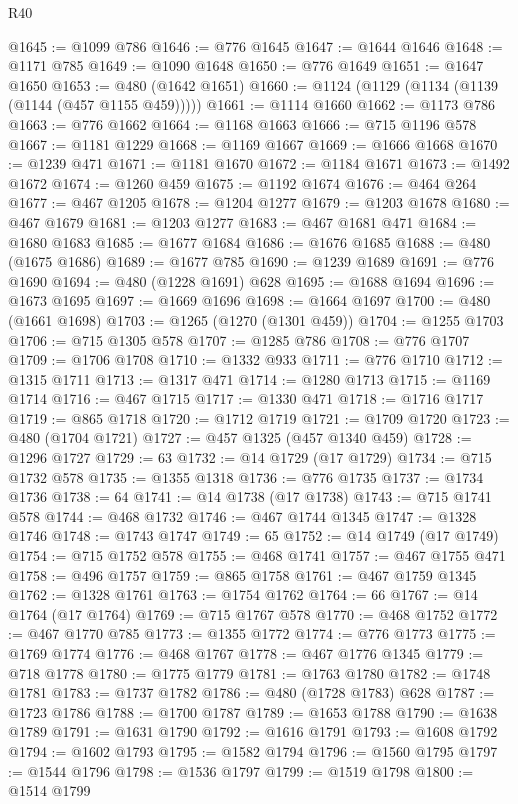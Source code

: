 \begin{lexlean}{R40}
\begin{coremodule}
{{{{{{{{{{{{{{{{{{{{{{{{{{{{{{{{{{{{{{{{{{{{{{{{{{{{{{{{{{{{{{{{{{{{{{{{{{{{{{{{{{{{{{{{{{{{{{{{{{{{{{{{{{{{{@1645 := @1099 @786
@1646 := @776 @1645
@1647 := @1644 @1646
@1648 := @1171 @785
@1649 := @1090 @1648
@1650 := @776 @1649
@1651 := @1647 @1650
@1653 := @480 (@1642 @1651)
@1660 := @1124 (@1129 (@1134 (@1139 (@1144 (@457 @1155 @459)))))
@1661 := @1114 @1660
@1662 := @1173 @786
@1663 := @776 @1662
@1664 := @1168 @1663
@1666 := @715 @1196 @578
@1667 := @1181 @1229
@1668 := @1169 @1667
@1669 := @1666 @1668
@1670 := @1239 @471
@1671 := @1181 @1670
@1672 := @1184 @1671
@1673 := @1492 @1672
@1674 := @1260 @459
@1675 := @1192 @1674
@1676 := @464 @264
@1677 := @467 @1205
@1678 := @1204 @1277
@1679 := @1203 @1678
@1680 := @467 @1679
@1681 := @1203 @1277
@1683 := @467 @1681 @471
@1684 := @1680 @1683
@1685 := @1677 @1684
@1686 := @1676 @1685
@1688 := @480 (@1675 @1686)
@1689 := @1677 @785
@1690 := @1239 @1689
@1691 := @776 @1690
@1694 := @480 (@1228 @1691) @628
@1695 := @1688 @1694
@1696 := @1673 @1695
@1697 := @1669 @1696
@1698 := @1664 @1697
@1700 := @480 (@1661 @1698)
@1703 := @1265 (@1270 (@1301 @459))
@1704 := @1255 @1703
@1706 := @715 @1305 @578
@1707 := @1285 @786
@1708 := @776 @1707
@1709 := @1706 @1708
@1710 := @1332 @933
@1711 := @776 @1710
@1712 := @1315 @1711
@1713 := @1317 @471
@1714 := @1280 @1713
@1715 := @1169 @1714
@1716 := @467 @1715
@1717 := @1330 @471
@1718 := @1716 @1717
@1719 := @865 @1718
@1720 := @1712 @1719
@1721 := @1709 @1720
@1723 := @480 (@1704 @1721)
@1727 := @457 @1325 (@457 @1340 @459)
@1728 := @1296 @1727
@1729 := 63
@1732 := @14 @1729 (@17 @1729)
@1734 := @715 @1732 @578
@1735 := @1355 @1318
@1736 := @776 @1735
@1737 := @1734 @1736
@1738 := 64
@1741 := @14 @1738 (@17 @1738)
@1743 := @715 @1741 @578
@1744 := @468 @1732
@1746 := @467 @1744 @1345
@1747 := @1328 @1746
@1748 := @1743 @1747
@1749 := 65
@1752 := @14 @1749 (@17 @1749)
@1754 := @715 @1752 @578
@1755 := @468 @1741
@1757 := @467 @1755 @471
@1758 := @496 @1757
@1759 := @865 @1758
@1761 := @467 @1759 @1345
@1762 := @1328 @1761
@1763 := @1754 @1762
@1764 := 66
@1767 := @14 @1764 (@17 @1764)
@1769 := @715 @1767 @578
@1770 := @468 @1752
@1772 := @467 @1770 @785
@1773 := @1355 @1772
@1774 := @776 @1773
@1775 := @1769 @1774
@1776 := @468 @1767
@1778 := @467 @1776 @1345
@1779 := @718 @1778
@1780 := @1775 @1779
@1781 := @1763 @1780
@1782 := @1748 @1781
@1783 := @1737 @1782
@1786 := @480 (@1728 @1783) @628
@1787 := @1723 @1786
@1788 := @1700 @1787
@1789 := @1653 @1788
@1790 := @1638 @1789
@1791 := @1631 @1790
@1792 := @1616 @1791
@1793 := @1608 @1792
@1794 := @1602 @1793
@1795 := @1582 @1794
@1796 := @1560 @1795
@1797 := @1544 @1796
@1798 := @1536 @1797
@1799 := @1519 @1798
@1800 := @1514 @1799
}}}}}}}}}}}}}}}}}}}}}}}}}}}}}}}}}}}}}}}}}}}}}}}}}}}}}}}}}}}}}}}}}}}}}}}}}}}}}}}}}}}}}}}}}}}}}}}}}}}}}}}}}}}}}
\end{coremodule}
\end{lexlean}

